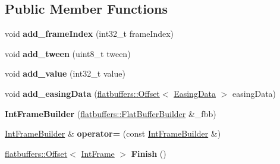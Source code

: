 \subsection*{Public Member Functions}
\begin{DoxyCompactItemize}
\item 
\mbox{\label{structflatbuffers_1_1IntFrameBuilder_a8014d6133f45a2f373571b68b00ba34f}} 
void {\bfseries add\+\_\+frame\+Index} (int32\+\_\+t frame\+Index)
\item 
\mbox{\label{structflatbuffers_1_1IntFrameBuilder_a3d5b707c5329d14f11df65393791648a}} 
void {\bfseries add\+\_\+tween} (uint8\+\_\+t tween)
\item 
\mbox{\label{structflatbuffers_1_1IntFrameBuilder_a40183b4cc05cee7bb8dd81389c2fb151}} 
void {\bfseries add\+\_\+value} (int32\+\_\+t value)
\item 
\mbox{\label{structflatbuffers_1_1IntFrameBuilder_a1d8d29f6c1a12c3153e380462fe7b345}} 
void {\bfseries add\+\_\+easing\+Data} (\hyperlink{structflatbuffers_1_1Offset}{flatbuffers\+::\+Offset}$<$ \hyperlink{structflatbuffers_1_1EasingData}{Easing\+Data} $>$ easing\+Data)
\item 
\mbox{\label{structflatbuffers_1_1IntFrameBuilder_a65b19ec140cab367db204b764e2ca2e3}} 
{\bfseries Int\+Frame\+Builder} (\hyperlink{classflatbuffers_1_1FlatBufferBuilder}{flatbuffers\+::\+Flat\+Buffer\+Builder} \&\+\_\+fbb)
\item 
\mbox{\label{structflatbuffers_1_1IntFrameBuilder_a146c7f418bc7254499335a1d5d97bd6c}} 
\hyperlink{structflatbuffers_1_1IntFrameBuilder}{Int\+Frame\+Builder} \& {\bfseries operator=} (const \hyperlink{structflatbuffers_1_1IntFrameBuilder}{Int\+Frame\+Builder} \&)
\item 
\mbox{\label{structflatbuffers_1_1IntFrameBuilder_a99ffab51b16723e023386d0e3dfcab3f}} 
\hyperlink{structflatbuffers_1_1Offset}{flatbuffers\+::\+Offset}$<$ \hyperlink{structflatbuffers_1_1IntFrame}{Int\+Frame} $>$ {\bfseries Finish} ()

\end{DoxyCompactItemize}
